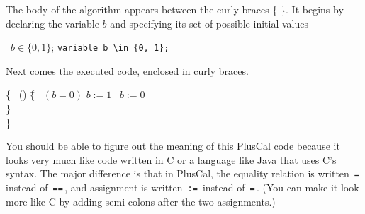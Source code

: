 The body of the algorithm appears between the curly braces \{\,\,\}.
It begins by declaring the variable $b$ and specifying its set of
possible initial values%
\begin{twocols}
\variable\ $b \in 
\{0, 1\}$;
\midcol
\verb|variable b \in {0, 1};|
\end{twocols}
Next comes the executed code, enclosed in curly braces.%
\begin{display}
\begin{tabbing}
\{ \pwhile\ (\TRUE) \= \{ \pif\ $(b = 0)$ $b := 1$ \pelse\ $b := 0$
\\
\> \}\\
\}
\end{tabbing}
\end{display}
You should be able to figure out the meaning of this PlusCal code
because it looks very much like code written in C or a language like
Java that uses C's syntax.  The major difference is that in PlusCal,
the equality relation is written \,\verb|=|\, instead of
\,\verb|==|\,, and assignment is written \,\verb|:=|\, instead of
\,\verb|=|\,.  (You can make it look more like C by adding 
semi-colons after the two assignments.)

